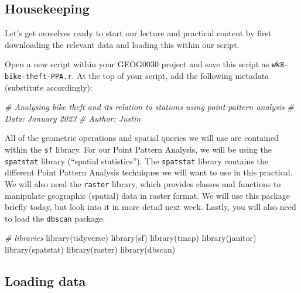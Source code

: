 \documentclass[
]{book}
\newenvironment{Shaded}{\begin{snugshade}}{\end{snugshade}}
\newcommand{\CommentTok}[1]{\textcolor[rgb]{0.56,0.35,0.01}{\textit{#1}}}
\newcommand{\FunctionTok}[1]{\textcolor[rgb]{0.00,0.00,0.00}{#1}}
\newcommand{\NormalTok}[1]{#1}
\begin{document}
\hypertarget{housekeeping-w08}{%
\subsection{Housekeeping}\label{housekeeping-w08}}

Let's get ourselves ready to start our lecture and practical content by first downloading the relevant data and loading this within our script.

Open a new script within your GEOG0030 project and save this script as \texttt{wk8-bike-theft-PPA.r}. At the top of your script, add the following metadata (substitute accordingly):

\begin{Shaded}
\begin{Highlighting}[]
\CommentTok{\# Analysing bike theft and its relation to stations using point pattern analysis}
\CommentTok{\# Data: January 2023}
\CommentTok{\# Author: Justin}
\end{Highlighting}
\end{Shaded}

All of the geometric operations and spatial queries we will use are contained within the \texttt{sf} library. For our Point Pattern Analysis, we will be using the \texttt{spatstat} library (``spatial statistics''). The \texttt{spatstat} library contains the different Point Pattern Analysis techniques we will want to use in this practical. We will also need the \texttt{raster} library, which provides classes and functions to manipulate geographic (spatial) data in raster format. We will use this package briefly today, but look into it in more detail next week. Lastly, you will also need to load the \texttt{dbscan} package.

\begin{Shaded}
\begin{Highlighting}[]
\CommentTok{\# libraries}
\FunctionTok{library}\NormalTok{(tidyverse)}
\FunctionTok{library}\NormalTok{(sf)}
\FunctionTok{library}\NormalTok{(tmap)}
\FunctionTok{library}\NormalTok{(janitor)}
\FunctionTok{library}\NormalTok{(spatstat)}
\FunctionTok{library}\NormalTok{(raster)}
\FunctionTok{library}\NormalTok{(dbscan)}
\end{Highlighting}
\end{Shaded}

\hypertarget{loading-data-w08}{%
\subsection{Loading data}\label{loading-data-w08}}
\end{document}
